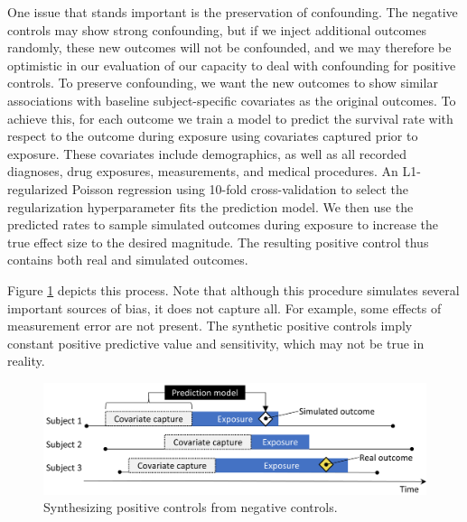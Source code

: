 \documentclass[11pt]{book}
\theoremstyle{definition}
\theoremstyle{definition}
\theoremstyle{definition}
\theoremstyle{remark}
\begin{document}
One issue that stands important is the preservation of confounding. The
negative controls may show strong confounding, but if we inject
additional outcomes randomly, these new outcomes will not be confounded,
and we may therefore be optimistic in our evaluation of our capacity to
deal with confounding for positive controls. To preserve confounding, we
want the new outcomes to show similar associations with baseline
subject-specific covariates as the original outcomes. To achieve this,
for each outcome we train a model to predict the survival rate with
respect to the outcome during exposure using covariates captured prior
to exposure. These covariates include demographics, as well as all
recorded diagnoses, drug exposures, measurements, and medical
procedures. An L1-regularized Poisson regression \citep{suchard_2013}
using 10-fold cross-validation to select the regularization
hyperparameter fits the prediction model. We then use the predicted
rates to sample simulated outcomes during exposure to increase the true
effect size to the desired magnitude. The resulting positive control
thus contains both real and simulated outcomes.

Figure \ref{fig:posControlSynth} depicts this process. Note that
although this procedure simulates several important sources of bias, it
does not capture all. For example, some effects of measurement error are
not present. The synthetic positive controls imply constant positive
predictive value and sensitivity, which may not be true in reality.

\begin{figure}

{\centering \includegraphics[width=0.9\linewidth]{images/MethodValidity/posControlSynth} 

}

\caption{Synthesizing positive controls from negative controls.}\label{fig:posControlSynth}
\end{figure}
\end{document}
